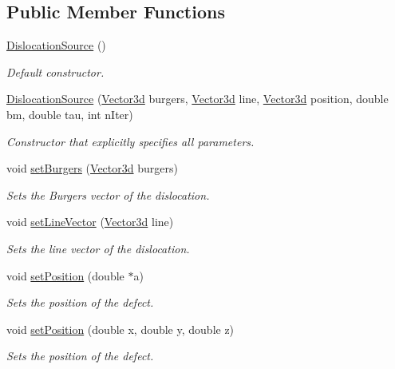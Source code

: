 \subsection*{Public Member Functions}
\begin{DoxyCompactItemize}
\item 
\hyperlink{classDislocationSource_afc9b7984d9486354b6f3d82033707577}{Dislocation\-Source} ()
\begin{DoxyCompactList}\small\item\em Default constructor. \end{DoxyCompactList}\item 
\hyperlink{classDislocationSource_aa5adcc1a0862d8cfa6d8d1a632c3855f}{Dislocation\-Source} (\hyperlink{classVector3d}{Vector3d} burgers, \hyperlink{classVector3d}{Vector3d} line, \hyperlink{classVector3d}{Vector3d} position, double bm, double tau, int n\-Iter)
\begin{DoxyCompactList}\small\item\em Constructor that explicitly specifies all parameters. \end{DoxyCompactList}\item 
void \hyperlink{classDislocationSource_ae1a26d9f8149206b884436f44e92f4c3}{set\-Burgers} (\hyperlink{classVector3d}{Vector3d} burgers)
\begin{DoxyCompactList}\small\item\em Sets the Burgers vector of the dislocation. \end{DoxyCompactList}\item 
void \hyperlink{classDislocationSource_adf7d0b496f5935909daf071a0d733b17}{set\-Line\-Vector} (\hyperlink{classVector3d}{Vector3d} line)
\begin{DoxyCompactList}\small\item\em Sets the line vector of the dislocation. \end{DoxyCompactList}\item 
void \hyperlink{classDefect_a2d233d13a8a93f6fba463a1fbc1c6c9f}{set\-Position} (double $\ast$a)
\begin{DoxyCompactList}\small\item\em Sets the position of the defect. \end{DoxyCompactList}\item 
void \hyperlink{classDefect_ad1a6acd8399d2ecabb7ce2b77623bbec}{set\-Position} (double x, double y, double z)
\begin{DoxyCompactList}\small\item\em Sets the position of the defect. \end{DoxyCompactList}\item 

\end{DoxyCompactItemize}
